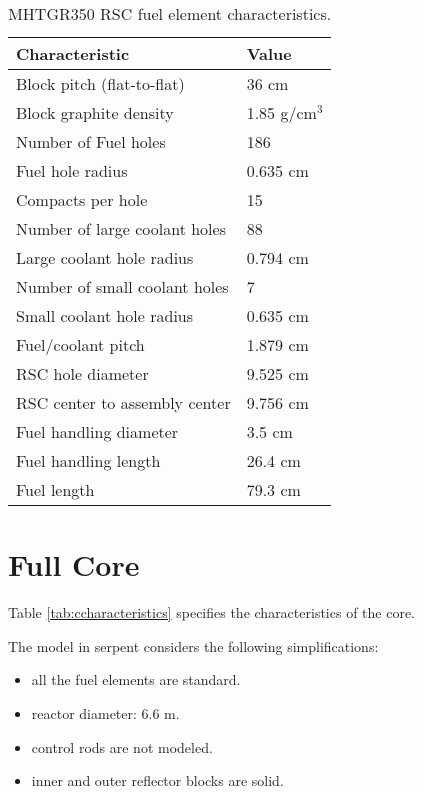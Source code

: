\documentclass[11pt,letterpaper]{article}
\begin{document}
	\begin{table}[H]
		\centering
	    \caption{MHTGR350 RSC fuel element characteristics.}
	    \label{tab:rcharacteristics}
		\begin{tabular}{l|l}
		\hline
		Characteristic                   & Value         \\ \hline
		Block pitch (flat-to-flat)       & 36 cm         \\
		Block graphite density           & 1.85 g/cm$^3$ \\
		Number of Fuel holes             & 186           \\
		Fuel hole radius                 & 0.635 cm      \\
		Compacts per hole                & 15            \\
		Number of large coolant holes    & 88            \\
		Large coolant hole radius        & 0.794 cm      \\
		Number of small coolant holes    & 7             \\
		Small coolant hole radius        & 0.635 cm      \\
		Fuel/coolant pitch               & 1.879 cm      \\ 
		RSC hole diameter                & 9.525 cm      \\
		RSC center to assembly center    & 9.756 cm      \\
		Fuel handling diameter           & 3.5 cm        \\ 
		Fuel handling length             & 26.4 cm       \\
		Fuel length                      & 79.3 cm       \\ \hline
		\end{tabular}
	\end{table}

\section{Full Core}

Table \ref{tab:ccharacteristics} specifies the characteristics of the core.

The model in serpent considers the following simplifications:
\begin{itemize}
	\item all the fuel elements are standard.
	\item reactor diameter: 6.6 m.
    \item control rods are not modeled.
	\item inner and outer reflector blocks are solid.
\end{itemize}
\end{document}

